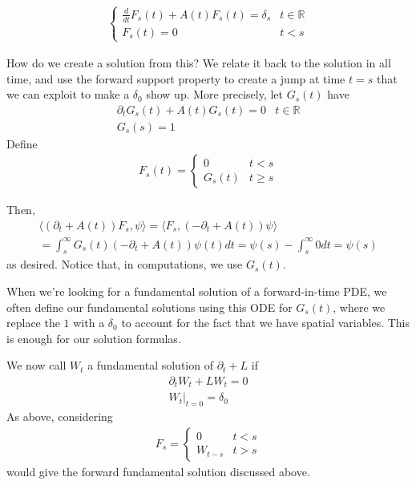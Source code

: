 \documentclass{article}
\newcommand{\R}{{\mathbb{R}}}
\newcommand{\pd}{\partial}
\begin{document}
	\begin{align*}
		\begin{cases}
			\frac{d}{dt} F_{s}(t) + A(t) F_{s}(t) = \delta_{s} & t \in \R\\
			F_{s}(t) = 0 & t<s
		\end{cases}
	\end{align*}
	
	How do we create a solution from this? We relate it back to the solution in all time, and use the forward support property to create a jump at time $t=s$ that we can exploit to make a $\delta_0$ show up. More precisely, let $G_{s}(t)$ have
	\begin{align*}
		\pd_{t} G_{s}(t) + A(t)G_{s}(t) = 0 & t \in \R \\
		G_{s}(s) = 1 
	\end{align*}
	Define 
	\begin{align*}
		F_{s}(t) = \begin{cases}
			0 & t<s \\
			G_{s}(t) & t \geq s
		\end{cases}
	\end{align*}
	
	Then, 
	\begin{align*}
		\langle (\pd_{t} + A(t))F_{s},\psi\rangle =  \langle F_{s},(-\pd_{t} + A(t))\psi\rangle \\
		= \int_{s}^{\infty} G_{s}(t) (-\pd_{t} + A(t))\psi(t)dt = \psi(s) - \int_{s}^{\infty} 0 dt = \psi(s)
	\end{align*}
	as desired. Notice that, in computations, we use $G_{s}(t)$.
	
	When we're looking for a fundamental solution of a forward-in-time PDE, we often define our fundamental solutions using this ODE for $G_{s}(t)$, where we replace the $1$ with a $\delta_0$ to account for the fact that we have spatial variables. This is enough for our solution formulas. 
	
	We now call $W_{t}$ a fundamental solution of $\pd_{t} + L$ if
	\begin{align*}
		\pd_{t}W_{t} + LW_{t} = 0 \\
		W_{t} |_{t=0} = \delta_0
	\end{align*}
 	As above, considering 
 	\begin{align*}
 		F_{s} = \begin{cases}
 			0 & t< s \\
 			W_{t-s} & t>s
 		\end{cases}
 	\end{align*}
 	would give the forward fundamental solution discussed above. 
	
\end{document}
